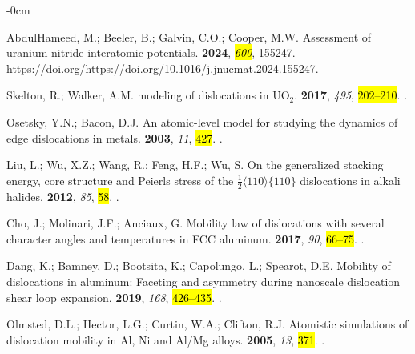 \documentclass[applsci,article,accept,pdftex,moreauthors]{Definitions/mdpi}
\newcommand{\?}{\stackrel{?}{=}}
\begin{document}
\begin{adjustwidth}{-\extralength}{0cm}
\begin{thebibliography}{999}
AbdulHameed, M.; Beeler, B.; Galvin, C.O.; Cooper, M.W.
\newblock Assessment of uranium nitride interatomic potentials.
 {\bf 2024}, \emph{\hl{600}}, 155247.
\newblock
  {\url{https://doi.org/https://doi.org/10.1016/j.jnucmat.2024.155247}}.

Skelton, R.; Walker, A.M.
 modeling of dislocations in {UO$_2$}.
 {\bf 2017}, {\em 495}, \hl{202--210}.
.

Osetsky, Y.N.; Bacon, D.J.
\newblock An atomic-level model for studying the dynamics of edge dislocations
  in metals.
  {\bf 2003}, {\em 11}, \hl{427}.
.

Liu, L.; Wu, X.Z.; Wang, R.; Feng, H.F.; Wu, S.
\newblock On the generalized stacking energy, core structure and {Peierls}
  stress of the $\frac{1}{2} \langle 110 \rangle \{110\}$ dislocations in
  alkali halides.
 {\bf 2012}, {\em 85}, \hl{58}.
.

Cho, J.; Molinari, J.F.; Anciaux, G.
\newblock Mobility law of dislocations with several character angles and
  temperatures in {FCC} aluminum.
 {\bf 2017}, {\em 90}, \hl{66--75}.
.

Dang, K.; Bamney, D.; Bootsita, K.; Capolungo, L.; Spearot, D.E.
\newblock Mobility of dislocations in aluminum: Faceting and asymmetry during
  nanoscale dislocation shear loop expansion.
 {\bf 2019}, {\em 168}, \hl{426--435}.
.

Olmsted, D.L.; Hector, L.G.; Curtin, W.A.; Clifton, R.J.
\newblock Atomistic simulations of dislocation mobility in {Al}, {Ni} and
  {Al/Mg} alloys.
  {\bf 2005}, {\em 13}, \hl{371}.
.


\end{thebibliography}
\end{adjustwidth}
\end{document}
